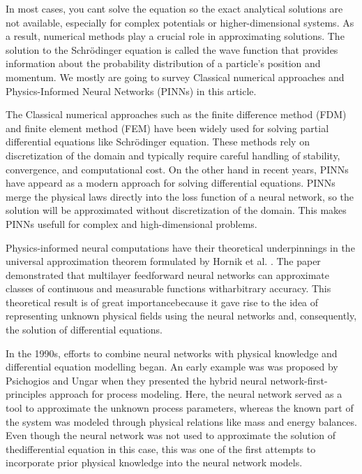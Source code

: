 \documentclass[11pt]{article}
\begin{document}
In most cases, you cant solve the equation so the exact analytical solutions are not available, especially for complex potentials or higher-dimensional systems. As a result, numerical methods play a crucial role in approximating solutions. The solution to the Schrödinger equation is called the wave function that provides information about the probability distribution of a particle's position and momentum. We mostly are going to survey Classical numerical approaches and Physics-Informed Neural Networks (PINNs) in this article.

The Classical numerical approaches such as the finite difference method (FDM) and finite element method (FEM) have been widely used for solving partial differential equations like Schrödinger equation. These methods rely on discretization of the domain and typically require careful handling of stability, convergence, and computational cost. On the other hand in recent years, PINNs have appeard as a modern approach for solving differential equations. PINNs merge the physical laws directly into the loss function of a neural network, so the solution will be approximated without discretization of the domain. This makes PINNs usefull for complex and high-dimensional problems.

Physics-informed neural computations have their theoretical underpinnings in the universal approximation theorem formulated by Hornik et al. \cite{hornikMultilayerFeedforwardNetworks1989}. The paper demonstrated that multilayer feedforward neural networks can approximate classes of continuous and measurable functions witharbitrary accuracy. This theoretical result is of great importancebecause it gave rise to the idea of representing unknown physical fields using the neural networks and, consequently, the solution of differential equations.

In the 1990s, efforts to combine neural networks with physical knowledge and differential equation modelling began. An early example was was proposed by Psichogios and Ungar \cite{psichogiosHybridNeuralNetworkfirst1992} when they presented the hybrid neural network-first-principles approach for process modeling. Here, the neural network served as a tool to approximate the unknown process parameters, whereas the known part of the system was modeled through physical relations like mass and energy balances. Even though the neural network was not used to approximate the solution of thedifferential equation in this case, this was one of the first attempts to incorporate prior physical knowledge into the neural network models.
\end{document}
